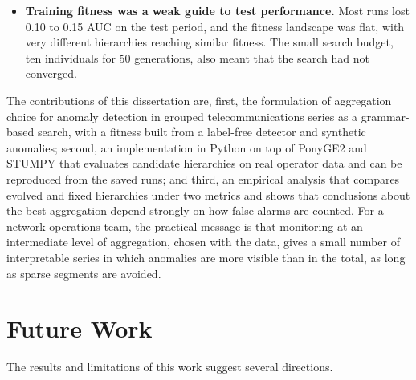 \begin{itemize}
    \item \textbf{Training fitness was a weak guide to test performance.}
    Most runs lost 0.10 to 0.15 \ac{AUC} on the test period, and the fitness landscape was flat, with very different hierarchies reaching similar fitness.
    The small search budget, ten individuals for 50 generations, also meant that the search had not converged.
\end{itemize}

The contributions of this dissertation are, first, the formulation of aggregation choice for anomaly detection in grouped telecommunications series as a grammar-based search, with a fitness built from a label-free detector and synthetic anomalies; second, an implementation in Python on top of PonyGE2 and STUMPY that evaluates candidate hierarchies on real operator data and can be reproduced from the saved runs; and third, an empirical analysis that compares evolved and fixed hierarchies under two metrics and shows that conclusions about the best aggregation depend strongly on how false alarms are counted.
For a network operations team, the practical message is that monitoring at an intermediate level of aggregation, chosen with the data, gives a small number of interpretable series in which anomalies are more visible than in the total, as long as sparse segments are avoided.

\section{Future Work}

The results and limitations of this work suggest several directions.

